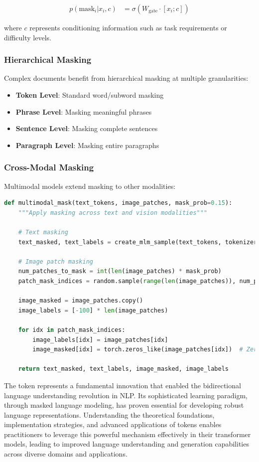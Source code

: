 \begin{align}
p(\text{mask}_i | x_i, c) &= \sigma(W_{\text{gate}} \cdot [x_i; c])
\end{align}

where $c$ represents conditioning information such as task requirements or difficulty levels.

\subsubsection{Hierarchical Masking}

Complex documents benefit from hierarchical masking at multiple granularities:

\begin{itemize}
\item \textbf{Token Level}: Standard word/subword masking
\item \textbf{Phrase Level}: Masking meaningful phrases
\item \textbf{Sentence Level}: Masking complete sentences
\item \textbf{Paragraph Level}: Masking entire paragraphs
\end{itemize}

\subsubsection{Cross-Modal Masking}

Multimodal models extend masking to other modalities:

\begin{lstlisting}[language=Python, caption=Cross-modal masking example]
def multimodal_mask(text_tokens, image_patches, mask_prob=0.15):
    """Apply masking across text and vision modalities"""
    
    # Text masking
    text_masked, text_labels = create_mlm_sample(text_tokens, tokenizer, mask_prob)
    
    # Image patch masking
    num_patches_to_mask = int(len(image_patches) * mask_prob)
    patch_mask_indices = random.sample(range(len(image_patches)), num_patches_to_mask)
    
    image_masked = image_patches.copy()
    image_labels = [-100] * len(image_patches)
    
    for idx in patch_mask_indices:
        image_labels[idx] = image_patches[idx]
        image_masked[idx] = torch.zeros_like(image_patches[idx])  # Zero out patch
    
    return text_masked, text_labels, image_masked, image_labels
\end{lstlisting}

The \mask{} token represents a fundamental innovation that enabled the bidirectional language understanding revolution in NLP. Its sophisticated learning paradigm, through masked language modeling, has proven essential for developing robust language representations. Understanding the theoretical foundations, implementation strategies, and advanced applications of \mask{} tokens enables practitioners to leverage this powerful mechanism effectively in their transformer models, leading to improved language understanding and generation capabilities across diverse domains and applications.